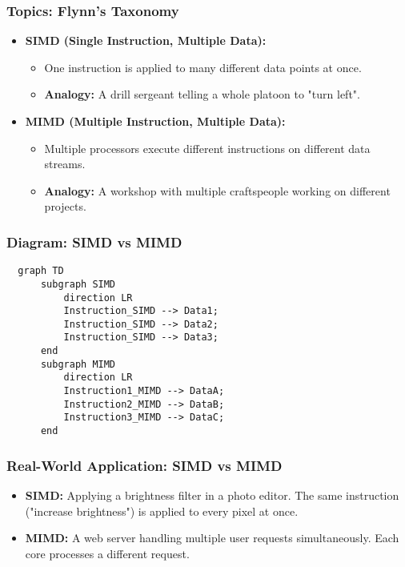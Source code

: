 \documentclass{beamer}
\begin{document}
\begin{frame}[fragile]
  \frametitle{Topics: Flynn's Taxonomy}
  \begin{itemize}
    \item \textbf{SIMD (Single Instruction, Multiple Data):}
    \begin{itemize}
        \item One instruction is applied to many different data points at once.
        \item \textbf{Analogy:} A drill sergeant telling a whole platoon to "turn left".
    \end{itemize}
    \item \textbf{MIMD (Multiple Instruction, Multiple Data):}
    \begin{itemize}
        \item Multiple processors execute different instructions on different data streams.
        \item \textbf{Analogy:} A workshop with multiple craftspeople working on different projects.
    \end{itemize}
  \end{itemize}
\end{frame}

\begin{frame}[fragile]
  \frametitle{Diagram: SIMD vs MIMD}
  \begin{verbatim}
  graph TD
      subgraph SIMD
          direction LR
          Instruction_SIMD --> Data1;
          Instruction_SIMD --> Data2;
          Instruction_SIMD --> Data3;
      end
      subgraph MIMD
          direction LR
          Instruction1_MIMD --> DataA;
          Instruction2_MIMD --> DataB;
          Instruction3_MIMD --> DataC;
      end
  \end{verbatim}
\end{frame}

\begin{frame}
  \frametitle{Real-World Application: SIMD vs MIMD}
  \begin{itemize}
    \item \textbf{SIMD:} Applying a brightness filter in a photo editor. The same instruction ("increase brightness") is applied to every pixel at once.
    \item \textbf{MIMD:} A web server handling multiple user requests simultaneously. Each core processes a different request.
  \end{itemize}
\end{frame}
\end{document}
